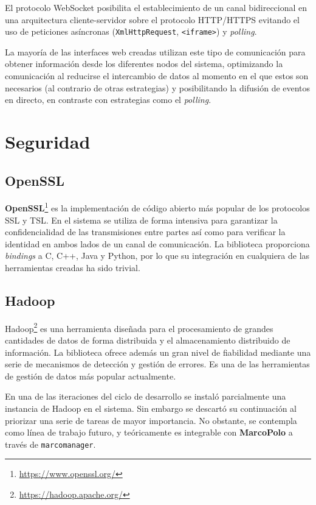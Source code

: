 El protocolo WebSocket \cite{rfc6455} posibilita el establecimiento de un canal bidireccional en una arquitectura cliente-servidor sobre el protocolo HTTP/HTTPS evitando el uso de peticiones asíncronas (\texttt{XmlHttpRequest}, \texttt{<iframe>}) y \textit{polling}.

La mayoría de las interfaces web creadas utilizan este tipo de comunicación para obtener información desde los diferentes nodos del sistema, optimizando la comunicación al reducirse el intercambio de datos al momento en el que estos son necesarios (al contrario de otras estrategias) y posibilitando la difusión de eventos en directo, en contraste con estrategias como el \textit{polling}.

\section{Seguridad}

\subsection{OpenSSL}

\textbf{OpenSSL}\footnote{\href{https://www.openssl.org/}{https://www.openssl.org/}} es la implementación de código abierto más popular de los protocolos SSL y TSL. En el sistema se utiliza de forma intensiva para garantizar la confidencialidad de las transmisiones entre partes así como para verificar la identidad en ambos lados de un canal de comunicación. La biblioteca proporciona \textit{bindings} a C, C++, Java y Python, por lo que su integración en cualquiera de las herramientas creadas ha sido trivial. 

\subsection{Hadoop}

Hadoop\footnote{\href{https://hadoop.apache.org/}{https://hadoop.apache.org/}} es una herramienta diseñada para el procesamiento de grandes cantidades de datos de forma distribuida y el almacenamiento distribuido de información. La biblioteca ofrece además un gran nivel de fiabilidad mediante una serie de mecanismos de detección y gestión de errores. Es una de las herramientas de gestión de datos más popular actualmente.

En una de las iteraciones del ciclo de desarrollo se instaló parcialmente una instancia de Hadoop en el sistema. Sin embargo se descartó su continuación al priorizar una serie de tareas de mayor importancia. No obstante, se contempla como línea de trabajo futuro, y teóricamente es integrable con \textbf{MarcoPolo} a través de \texttt{marcomanager}.

